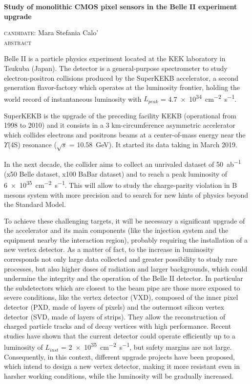 \documentclass[10pt,a4paper]{report}
\begin{document}
\begin{center} \bfseries
\LARGE Study of monolithic CMOS pixel sensors in the Belle II experiment upgrade\\

\vspace{5mm}

\textsc{\large candidate:} \normalsize Mara Stefania Calo'\\
\vspace{4mm}
\textsc{\large abstract}
\end{center}

Belle II is a particle physics experiment located at the KEK laboratory in Tsukuba (Japan). The detector is a general-purpose spectrometer to study electron-positron collisions produced by the SuperKEKB accelerator, a second generation flavor-factory which operates at the luminosity frontier, holding the world record of instantaneous luminosity with $L_{peak}$ = \SI{4.7e34}{cm^{-2}.s^{-1}}.

SuperKEKB is the upgrade of the preceding facility KEKB (operational from 1998 to 2010) and it consists in a 3 km-circumference asymmetric accelerator which collides electrons and positrons beams at a center-of-mass energy near the $\Upsilon$(4S) resonance ($\sqrt{s}$ = \SI{10.58}{GeV}). It started its data taking in March 2019.

In the next decade, the collider aims to collect  an unrivaled dataset of \SI{50}{ab^{-1}} (x50 Belle dataset, x100 BaBar dataset) and to reach a peak luminosity of \SI{6e35}{cm^{-2}.s^{-1}}. This will allow to study the charge-parity violation in B mesons system with more precision and to search for new hints of physics beyond the Standard Model.

To achieve these challenging targets, it will be necessary a significant upgrade of the accelerator and its main components (like the injection system and the equipment nearby the interaction region), probably requiring the installation of a new vertex detector. As a matter of fact, to the increase in luminosity corresponds not only large data collected and greater possibility to study rare processes, but also higher doses of radiation and larger backgrounds, which could undermine the integrity and the operation of the Belle II detector.
In particular the subdetectors which are closest to the beam pipe are those more exposed to severe conditions, like the vertex detector (VXD), composed of the inner pixel detector (PXD, made of layers of pixels) and the outermost silicon vertex detector (SVD, made of layers of strips). They allow the reconstruction of charged particle tracks and of decay vertices with high performance. Recent studies have shown that the current detector could operate efficiently up to a luminosity of $L_{inst}$ = \SI{2e35}{cm^{-2}.s^{-1}}, but safety margins are not large. 
Consequently, in this context, different upgrade projects have been proposed, which intend to design a new vertex detector, making it more resistant even in harsher working conditions, while the luminosity will be gradually increased. 
\end{document}

